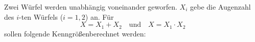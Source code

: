\documentclass{abgabe}
\begin{document}
\begin{questions}
    \question
    Zwei Würfel werden unabhängig voneinander geworfen. 
    $X_i$ gebe die Augenzahl des $i$-ten Würfels ($i = 1,2$) an. 
    Für 
    \[ 
    X = X_1 + X_2 \quad \text{und} \quad X = X_1 \cdot X_2
    \] 
    sollen folgende Kenngrößenberechnet werden:
\end{questions}
\end{document}
